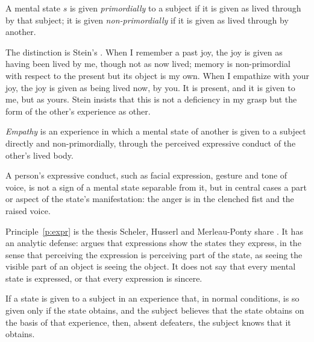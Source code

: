 \documentclass{situationist-preprint}
\begin{document}
\begin{definition}\label{d:prim}
A mental state $s$ is given \emph{primordially} to a subject if it is given as lived through by that subject; it is given \emph{non-primordially} if it is given as lived through by another.
\end{definition}

The distinction is Stein's \citep[ch.~2]{Stein1917}. When I remember a past joy, the joy is given as having been lived by me, though not as now lived; memory is non-primordial with respect to the present but its object is my own. When I empathize with your joy, the joy is given as being lived now, by you. It is present, and it is given to me, but as yours. Stein insists that this is not a deficiency in my grasp but the form of the other's experience as other.

\begin{definition}[Empathy]\label{d:emp}
\emph{Empathy} is an experience in which a mental state of another is given to a subject directly and non-primordially, through the perceived expressive conduct of the other's lived body.
\end{definition}

\begin{principle}\label{p:expr}
A person's expressive conduct, such as facial expression, gesture and tone of voice, is not a sign of a mental state separable from it, but in central cases a part or aspect of the state's manifestation: the anger is in the clenched fist and the raised voice.
\end{principle}

Principle~\ref{p:expr} is the thesis Scheler, Husserl and Merleau-Ponty share \citep{Scheler1923,Husserl1952,MerleauPonty1945}. It has an analytic defense: \citet{Green2007} argues that expressions show the states they express, in the sense that perceiving the expression is perceiving part of the state, as seeing the visible part of an object is seeing the object. It does not say that every mental state is expressed, or that every expression is sincere.

\begin{principle}\label{p:know}
If a state is given to a subject in an experience that, in normal conditions, is so given only if the state obtains, and the subject believes that the state obtains on the basis of that experience, then, absent defeaters, the subject knows that it obtains.
\end{principle}
\end{document}
